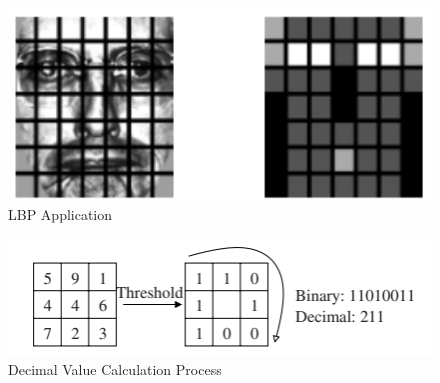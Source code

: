 \documentclass[
]{article}
\begin{document}
\begin{figure}[htbp]
  \centering
  \includegraphics[width=0.4\linewidth]{images/lbph_1.png}
  \caption{LBP Application}
\end{figure}

\begin{figure}[htbp]
  \centering
  \includegraphics[width=0.4\linewidth]{images/lbph_2.png}
  \caption{Decimal Value Calculation Process}
\end{figure}
\end{document}
